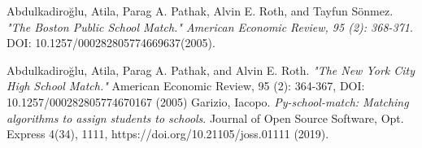 \documentclass[twocolumn]{bmcart}
\begin{document}
	\begin{backmatter}
		\begin{thebibliography}{9}
			Abdulkadiroğlu, Atila, Parag A. Pathak, Alvin E. Roth, and Tayfun Sönmez.
			\textit{"The Boston Public School Match." American Economic Review, 95 (2): 368-371}. 
			DOI: 10.1257/000282805774669637(2005).
			\vspace{\baselineskip}
			
			Abdulkadiroğlu, Atila, Parag A. Pathak, and Alvin E. Roth.
			\textit{"The New York City High School Match."}
			American Economic Review, {95 (2): 364-367}, DOI: 10.1257/000282805774670167 (2005)
			\vspace{\baselineskip}
			Garizio, Iacopo. 
			\textit{Py-school-match: Matching algorithms to assign students to schools}. 
			Journal of Open Source Software, Opt. Express {4(34)},
			1111, https://doi.org/10.21105/joss.01111 (2019).
			
		\end{thebibliography}
		
		
		
	\end{backmatter}
	
\end{document}
